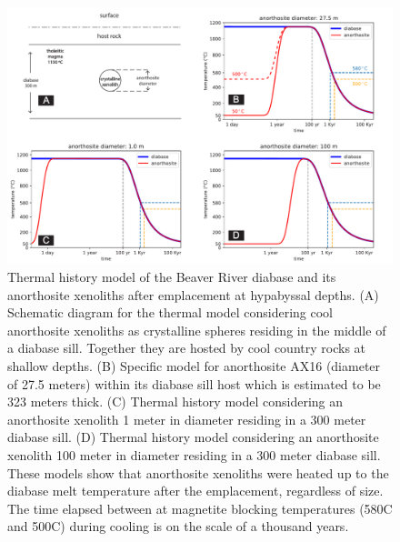 \documentclass[draft]{agujournal2019}
\begin{document}
\begin{figure}
\noindent\includegraphics[width=\textwidth]{thermal_history_model.pdf}
\caption{\footnotesize{Thermal history model of the Beaver River diabase and its anorthosite xenoliths after emplacement at hypabyssal depths. (A) Schematic diagram for the thermal model considering cool anorthosite xenoliths as crystalline spheres residing in the middle of a diabase sill. Together they are hosted by cool country rocks at shallow depths. (B) Specific model for anorthosite AX16 (diameter of 27.5 meters) within its diabase sill host which is estimated to be 323 meters thick. (C) Thermal history model considering an anorthosite xenolith 1 meter in diameter residing in a 300 meter diabase sill. (D) Thermal history model considering an anorthosite xenolith 100 meter in diameter residing in a 300 meter diabase sill. These models show that anorthosite xenoliths were heated up to the diabase melt temperature after the emplacement, regardless of size. The time elapsed between at magnetite blocking temperatures (580\textdegree C and 500\textdegree C) during cooling is on the scale of a thousand years.}}
\label{fig:thermal_history_model}
\end{figure}
\end{document}
